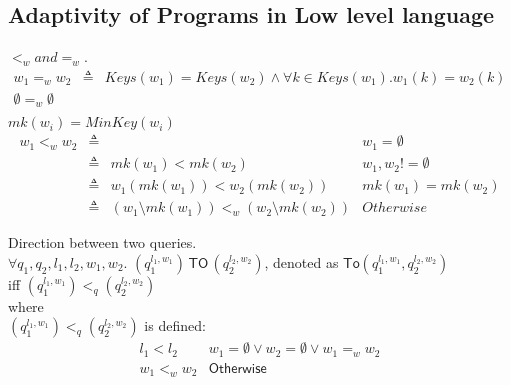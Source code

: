 \documentclass[a4paper,11pt]{article}
\begin{document}
\subsection{Adaptivity of Programs in Low level language}
%
%
\begin{defn}
$<_w and =_w$.\\
\[
  \begin{array}{lll}
     w_1 =_w w_2  &  \triangleq &  Keys(w_1) = Keys(w_2) \land \forall k \in Keys(w_1). w_1(k) = w_2(k) \\
     \emptyset =_w \emptyset & &   \\
  \end{array}
\] 
$mk(w_i) =MinKey(w_i) $ 
\[
\begin{array}{lllr}
     w_1 <_w w_2 & \triangleq & & w_1 = \emptyset \\
     & \triangleq  & mk(w_1) < mk(w_2) & w_1,w_2 != \emptyset  \\
     & \triangleq & w_1(mk(w_1)) < w_2(mk(w_2))   & mk(w_1) = mk(w_2) \\
     & \triangleq & (w_1 \setminus mk(w_1) ) <_w (w_2 \setminus mk(w_2)) & Otherwise
\end{array}
\]
\end{defn}
%
\begin{defn}
Direction between two queries.
\\
$\forall q_1,q_2, l_1, l_2, w_1, w_2 $.
$(q_1^{l_1, w_1}) \, \mathsf{TO} \, (q_2^{l_2,w_2})$,
denoted as $\mathsf{To}(q_1^{l_1, w_1}, q_2^{l_2,w_2})$ \\ iff $(q_1^{l_1, w_1}) <_q (q_2^{l_2, w_2})  $\\
where \\
$(q_1^{l_1, w_1}) <_q (q_2^{l_2, w_2})$ is defined:\\
\[
\begin{array}{ll}
    l_1 < l_2  & w_1=\emptyset \lor w_2 = \emptyset \lor w_1 =_w w_2   \\
    w_1 <_w w_2  & \mathsf{Otherwise}
\end{array}  
\]
\end{defn}
%
%
\end{document}
